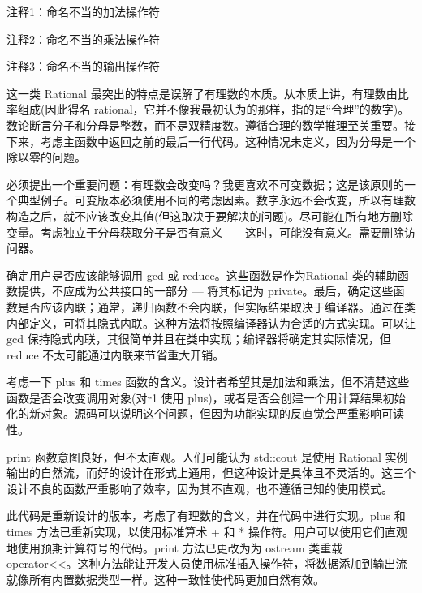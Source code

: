 {\footnotesize
注释1：命名不当的加法操作符

注释2：命名不当的乘法操作符

注释3：命名不当的输出操作符
}


这一类 Rational 最突出的特点是误解了有理数的本质。从本质上讲，有理数由比率组成(因此得名 rational，它并不像我最初认为的那样，指的是“合理”的数字)。数论断言分子和分母是整数，而不是双精度数。遵循合理的数学推理至关重要。接下来，考虑主函数中返回之前的最后一行代码。这种情况未定义，因为分母是一个除以零的问题。

必须提出一个重要问题：有理数会改变吗？我更喜欢不可变数据；这是该原则的一个典型例子。可变版本必须使用不同的考虑因素。数字永远不会改变，所以有理数构造之后，就不应该改变其值(但这取决于要解决的问题)。尽可能在所有地方删除变量。考虑独立于分母获取分子是否有意义——这时，可能没有意义。需要删除访问器。

确定用户是否应该能够调用 gcd 或 reduce。这些函数是作为Rational 类的辅助函数提供，不应成为公共接口的一部分 — 将其标记为 private。最后，确定这些函数是否应该内联；通常，递归函数不会内联，但实际结果取决于编译器。通过在类内部定义，可将其隐式内联。这种方法将按照编译器认为合适的方式实现。可以让 gcd 保持隐式内联，其很简单并且在类中实现；编译器将确定其实际情况，但 reduce 不太可能通过内联来节省重大开销。

考虑一下 plus 和 times 函数的含义。设计者希望其是加法和乘法，但不清楚这些函数是否会改变调用对象(对r1 使用 plus)，或者是否会创建一个用计算结果初始化的新对象。源码可以说明这个问题，但因为功能实现的反直觉会严重影响可读性。

print 函数意图良好，但不太直观。人们可能认为 std::cout 是使用 Rational 实例输出的自然流，而好的设计在形式上通用，但这种设计是具体且不灵活的。这三个设计不良的函数严重影响了效率，因为其不直观，也不遵循已知的使用模式。


此代码是重新设计的版本，考虑了有理数的含义，并在代码中进行实现。plus 和 times 方法已重新实现，以使用标准算术 + 和 * 操作符。用户可以使用它们直观地使用预期计算符号的代码。print 方法已更改为为 ostream 类重载 operator<{}<。这种方法能让开发人员使用标准插入操作符，将数据添加到输出流 - 就像所有内置数据类型一样。这种一致性使代码更加自然有效。


